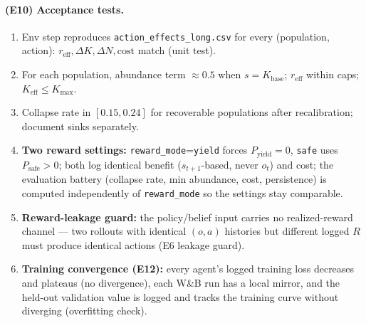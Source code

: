 \documentclass[11pt]{article}
\newcommand{\reff}{r_{\mathrm{eff}}}
\newcommand{\Keff}{K_{\mathrm{eff}}}
\newcommand{\Kbase}{K_{\mathrm{base}}}
\newcommand{\Kmax}{K_{\max}}
\newcommand{\code}[1]{\texttt{#1}}
\begin{document}
\paragraph{(E10) Acceptance tests.}
\begin{enumerate}[leftmargin=1.8em,nosep]
\item Env step reproduces \code{action\_effects\_long.csv} for every (population,
action): $\reff,\Delta K,\Delta N,\mathrm{cost}$ match (unit test).
\item For each population, abundance term $\approx0.5$ when $s{=}\Kbase$; $\reff$
within caps; $\Keff\le\Kmax$.
\item Collapse rate in $[0.15,0.24]$ for recoverable populations after recalibration;
document sinks separately.
\item \textbf{Two reward settings:} \code{reward\_mode}=\code{yield} forces
$P_{\mathrm{yield}}{=}0$, \code{safe} uses $P_{\mathrm{safe}}{>}0$; both log identical
benefit ($s_{t+1}$-based, never $o_t$) and cost; the evaluation battery (collapse rate,
min abundance, cost, persistence) is computed independently of \code{reward\_mode} so the
settings stay comparable.
\item \textbf{Reward-leakage guard:} the policy/belief input carries no
realized-reward channel --- two rollouts with identical $(o,a)$ histories but different
logged $R$ must produce identical actions (E6 leakage guard).
\item \textbf{Training convergence (E12):} every agent's logged training loss decreases
and plateaus (no divergence), each W\&B run has a local mirror, and the held-out
validation value is logged and tracks the training curve without diverging (overfitting
check).
\end{enumerate}
\end{document}
